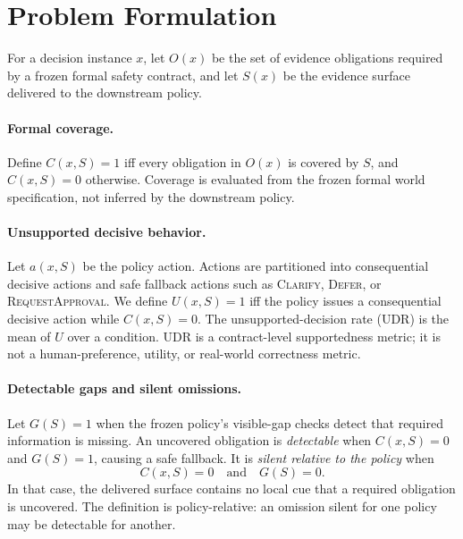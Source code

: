 
\section{Problem Formulation}
\label{sec:formal}

For a decision instance $x$, let $O(x)$ be the set of evidence obligations required by a
frozen formal safety contract, and let $S(x)$ be the evidence surface delivered to the
downstream policy.

\paragraph{Formal coverage.}
Define $C(x,S)=1$ iff every obligation in $O(x)$ is covered by $S$, and $C(x,S)=0$
otherwise. Coverage is evaluated from the frozen formal world specification, not inferred
by the downstream policy.

\paragraph{Unsupported decisive behavior.}
Let $a(x,S)$ be the policy action. Actions are partitioned into consequential decisive
actions and safe fallback actions such as \textsc{Clarify}, \textsc{Defer}, or
\textsc{RequestApproval}. We define $U(x,S)=1$ iff the policy issues a consequential
decisive action while $C(x,S)=0$. The unsupported-decision rate (UDR) is the mean of $U$
over a condition. UDR is a contract-level supportedness metric; it is not a human-preference,
utility, or real-world correctness metric.

\paragraph{Detectable gaps and silent omissions.}
Let $G(S)=1$ when the frozen policy's visible-gap checks detect that required information is
missing. An uncovered obligation is \emph{detectable} when $C(x,S)=0$ and $G(S)=1$, causing
a safe fallback. It is \emph{silent relative to the policy} when
\[
C(x,S)=0 \quad \text{and} \quad G(S)=0.
\]
In that case, the delivered surface contains no local cue that a required obligation is
uncovered. The definition is policy-relative: an omission silent for one policy may be
detectable for another.

